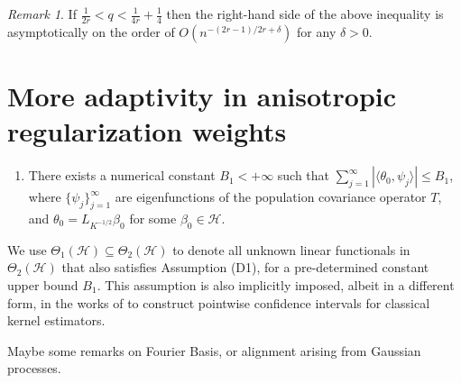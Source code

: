\documentclass[11pt,a4paper]{article}
\theoremstyle{definition}
\theoremstyle{plain}
\theoremstyle{remark}
\newtheorem{remark}{Remark}[section]
\newcommand{\mH}{\mathcal H}
\begin{document}
\begin{remark}
If $\frac{1}{2r}<q<\frac{1}{4r}+\frac{1}{4}$ then the right-hand side of the above inequality is asymptotically on the order of $O(n^{-(2r-1)/2r+\delta})$ for any $\delta>0$.
\end{remark}



\section{More adaptivity in anisotropic regularization weights}\label{sec:adptr}

\begin{enumerate}
\item[(C1)] There exists a numerical constant $B_1<+\infty$ such that $\sum_{j=1}^{\infty}|\langle \theta_0, \psi_j\rangle| \leq B_1$, where $\{\psi_j\}_{j=1}^{\infty}$ are eigenfunctions of the population covariance operator $T$,
and $\theta_0=L_{K^{-1/2}}\beta_0$ for some $\beta_0\in\mH$.
\end{enumerate}
We use $\Theta_1(\mH)\subseteq\Theta_2(\mH)$ to denote all unknown linear functionals in $\Theta_2(\mH)$ that also satisfies Assumption (D1), for a pre-determined constant upper bound $B_1$.
This assumption is also implicitly imposed, albeit in a different form, in the works of \cite{liu2025scalable} to construct pointwise confidence intervals for classical kernel estimators.

{\color{red}Maybe some remarks on Fourier Basis, or alignment arising from Gaussian processes.}
\end{document}
